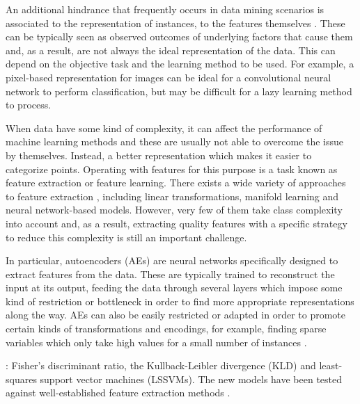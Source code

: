 An additional hindrance that frequently occurs in data mining scenarios is associated to the representation of instances, to the features themselves \cite{DimRecComparative}. These can be typically seen as observed outcomes of underlying factors that cause them and, as a result, are not always the ideal representation of the data. This can depend on the objective task and the learning method to be used. For example, a pixel-based representation for images can be ideal for a convolutional neural network to perform classification, but may be difficult for a lazy learning method to process.

When data have some kind of complexity, it can affect the performance of machine learning methods and these are usually not able to overcome the issue by themselves. Instead,  a better representation which makes it easier to categorize points. Operating with features for this purpose is a task known as feature extraction or feature learning. There exists a wide variety of approaches to feature extraction \cite{bengio2013representation}, including linear transformations, manifold learning and neural network-based models. However, very few of them take class complexity into account and, as a result, extracting quality features with a specific strategy to reduce this complexity is still an important challenge.

In particular, autoencoders (AEs) \cite{charte-tutorial} are neural networks specifically designed to extract features from the data. These are typically trained to reconstruct the input at its output, feeding the data through several layers which impose some kind of restriction or bottleneck in order to find more appropriate representations along the way. AEs can also be easily restricted or adapted in order to promote certain kinds of transformations and encodings, for example, finding sparse variables which only take high values for a small number of instances \cite{ng2011sparse}.

: Fisher's discriminant ratio, the Kullback-Leibler divergence (KLD) and least-squares support vector machines (LSSVMs). The new models have been tested against well-established feature extraction methods .

